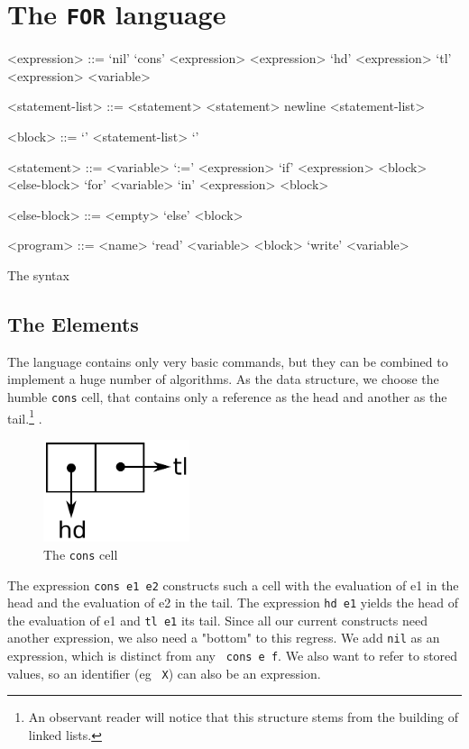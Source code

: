 \section{The {\tt FOR} language}
\label{sec:FOR}
\begin{table}[htb]
	\begin{grammar}
		<expression> ::= 
							`nil' 
				\alt 	`cons' <expression> <expression>
				\alt 	`hd' <expression>
				\alt 	`tl' <expression>
				\alt 	<variable>

		<statement-list> ::= <statement> \alt <statement> newline <statement-list>

		<block> ::= `{' <statement-list> `}'

		<statement> ::=
							<variable> `:=' <expression>
				\alt	`if' <expression> <block> <else-block>
				\alt	`for' <variable> `in' <expression> <block>
			
				<else-block> ::= <empty> \alt `else' <block>
				
				<program> ::= <name> `read' <variable> <block> `write' <variable>
	\end{grammar}
	\caption{The \FOR syntax \label{tab:FOR-syntax}}
\end{table}

\subsection{The Elements} %
\label{sub:The Elements}
The \FOR language contains only very basic commands, but they can be combined
to implement a huge number of algorithms. As the data structure, we choose 
the humble {\tt cons} cell, that contains only a reference as the head and 
another as the tail.\footnote{An observant reader will notice that this
structure stems from the building of linked lists.}
.
\begin{figure}[htb]
	\begin{center}
		\includegraphics[height=3cm]{introduction/for/images/conscell}
	\end{center}
	\caption{The {\tt cons} cell}
\end{figure}

The expression {\tt cons e1 e2} constructs such a cell with the evaluation of
e1 in the head and the evaluation of e2 in the tail. The expression {\tt hd e1}
yields the head of the evaluation of e1 and {\tt tl e1} its tail. Since all our
current constructs need another expression, we also need a "bottom" to this
regress. We add {\tt nil} as an expression, which is distinct from any {\tt
cons e f}. We also want to refer to stored values, so an identifier (eg {\tt
X}) can also be an expression.

